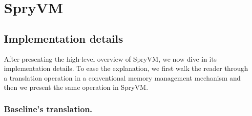 


\section{SpryVM}
\label{sec:associativity}

%



\subsection{Implementation details}

After presenting the high-level overview of SpryVM, we now dive in its
implementation details. To ease the explanation, we first walk the
reader through a translation operation in a conventional memory
management mechanism and then we present the same operation in SpryVM.

\subsubsection{Baseline's translation.}

